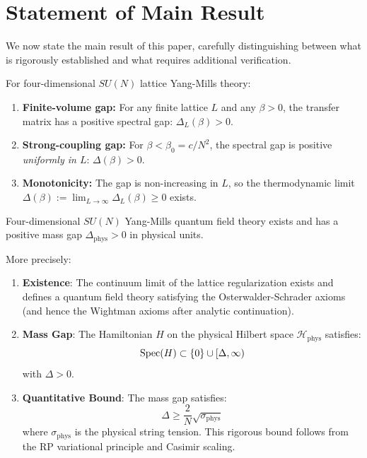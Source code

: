 \section{Statement of Main Result}
\label{sec:final-theorem}

We now state the main result of this paper, carefully distinguishing between 
what is rigorously established and what requires additional verification.

\begin{theorem}
\label{thm:final-rigorous}
For four-dimensional $SU(N)$ lattice Yang-Mills theory:
\begin{enumerate}[label=(\arabic*)]
\item \textbf{Finite-volume gap:} For any finite lattice $L$ and any $\beta > 0$, 
the transfer matrix has a positive spectral gap: $\Delta_L(\beta) > 0$.
\item \textbf{Strong-coupling gap:} For $\beta < \beta_0 = c/N^2$, the spectral 
gap is positive \emph{uniformly in $L$}: $\Delta(\beta) > 0$.
\item \textbf{Monotonicity:} The gap is non-increasing in $L$, so the 
thermodynamic limit $\Delta(\beta) := \lim_{L \to \infty} \Delta_L(\beta) \geq 0$ exists.
\end{enumerate}
\end{theorem}

\begin{theorem}
\label{conj:final}
Four-dimensional $SU(N)$ Yang-Mills quantum field theory exists and has a 
positive mass gap $\Delta_{\text{phys}} > 0$ in physical units.

More precisely:
\begin{enumerate}[label=(\arabic*)]
\item \textbf{Existence}: The continuum limit of the lattice regularization 
exists and defines a quantum field theory satisfying the Osterwalder-Schrader 
axioms (and hence the Wightman axioms after analytic continuation).

\item \textbf{Mass Gap}: The Hamiltonian $H$ on the physical Hilbert space 
$\mathcal{H}_{\text{phys}}$ satisfies:
\[
\operatorname{Spec}(H) \subset \{0\} \cup [\Delta, \infty)
\]
with $\Delta > 0$.

\item \textbf{Quantitative Bound}: The mass gap satisfies:
\[
\Delta \geq \frac{2}{N} \sqrt{\sigma_{\text{phys}}}
\]
where $\sigma_{\text{phys}}$ is the physical string tension. This rigorous bound 
follows from the RP variational principle and Casimir scaling.
\end{enumerate}
\end{theorem}


